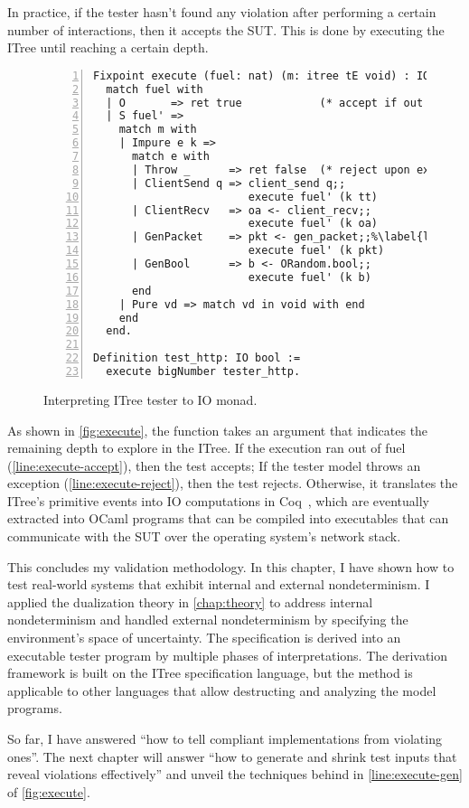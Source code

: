 In practice, if the tester hasn't found any violation after performing a certain
number of interactions, then it accepts the SUT.  This is done by executing the
ITree until reaching a certain depth.

\begin{figure}
\begin{lstlisting}[numbers=left]
Fixpoint execute (fuel: nat) (m: itree tE void) : IO bool :=
  match fuel with
  | O       => ret true            (* accept if out of fuel *)%\label{line:execute-accept}%
  | S fuel' =>
    match m with
    | Impure e k =>
      match e with
      | Throw _      => ret false  (* reject upon exception *)%\label{line:execute-reject}%
      | ClientSend q => client_send q;;
                        execute fuel' (k tt)
      | ClientRecv   => oa <- client_recv;;
                        execute fuel' (k oa)
      | GenPacket    => pkt <- gen_packet;;%\label{line:execute-gen}%
                        execute fuel' (k pkt)
      | GenBool      => b <- ORandom.bool;;
                        execute fuel' (k b)
      end
    | Pure vd => match vd in void with end
    end
  end.

Definition test_http: IO bool :=
  execute bigNumber tester_http.
\end{lstlisting}
\vspace*{1em}
\caption{Interpreting ITree tester to IO monad.}
\label{fig:execute}
\end{figure}

As shown in \autoref{fig:execute}, the  function takes an
argument  that indicates the remaining depth to explore in the ITree.
If the execution ran out of fuel (\autoref{line:execute-accept}), then the test
accepts; If the tester model throws an exception
(\autoref{line:execute-reject}), then the test rejects.  Otherwise, it
translates the ITree's primitive events into IO computations in
Coq~\cite{SimpleIO}, which are eventually extracted into OCaml programs that can
be compiled into executables that can communicate with the SUT over the
operating system's network stack.

This concludes my validation methodology.  In this chapter, I have shown how to
test real-world systems that exhibit internal and external nondeterminism.  I
applied the dualization theory in \autoref{chap:theory} to address internal
nondeterminism and handled external nondeterminism by specifying the
environment's space of uncertainty.  The specification is derived into an
executable tester program by multiple phases of interpretations.  The
derivation framework is built on the ITree specification language, but the
method is applicable to other languages that allow destructing and analyzing the
model programs.

So far, I have answered ``how to tell compliant implementations from violating
ones''.  The next chapter will answer ``how to generate and shrink test inputs
that reveal violations effectively'' and unveil the techniques behind
 in \autoref{line:execute-gen} of \autoref{fig:execute}.
